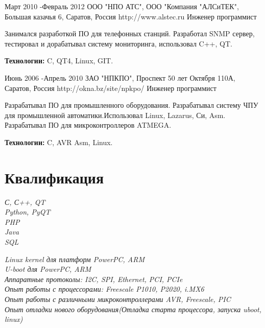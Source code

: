 
\job
{Март 2010 -}{Февраль 2012}
{ООО "НПО АТС", ООО "Компания "АЛСиТЕК", Большая казачья 6, Саратов, Россия}
{http://www.alstec.ru}
{Инженер программист}
{Занимался разработкой ПО для телефонных станций. Разработал SNMP сервер, тестировал и дорабатывал систему мониторинга, использовал C++, QT.
\rule{0mm}{5mm}\textbf{Технологии:} C, QT4, Linux, GIT.}



\job
{Июнь 2006 -}{Апрель 2010}
{ЗАО "НПКПО", Проспект 50 лет Октября 110А, Саратов, Россия}
{http://okna.bz/site/npkpo/}
{Инженер программист}
{Разрабатывал ПО для промышленного оборудования. Разрабатывал систему ЧПУ для промышленной автоматики.Использовал Linux, Lazarus, Си, Asm. Разрабатывал ПО для микроконтроллеров ATMEGA.
\rule{0mm}{5mm}\textbf{Технологии:} C, AVR Asm, Linux.}



\section{Квалификация}

{
\textit{С, С++, QT}\\
\textit{Python, PyQT}\\
\textit{PHP}\\
\textit{Java}\\
\textit{SQL}\\
}


{
\textit{Linux kernel для платформ PowerPC, ARM}\\
\textit{U-boot для PowerPC, ARM}\\
\textit{Аппаратные протоколы: I2C, SPI, Ethernet, PCI, PCIe}\\
\textit{Опыт работы с процессорами: Freescale P1010, P2020, i.MX6}\\
\textit{Опыт работы с различными микроконтроллерами AVR, Freescale, PIC}\\
\textit{Опыт отладки нового оборудования(Отладка старта процессора, запуска uboot, linux)}\\
}

